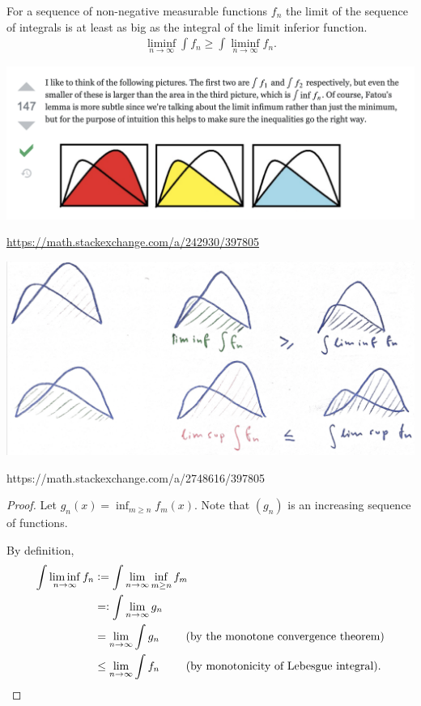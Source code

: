 \begin{theorem}
  For a sequence of non-negative measurable functions $f_n$ the limit of the sequence of integrals is at least
  as big as the integral of the limit inferior function.
  \begin{align*}
    \liminf_{n\to\infty} \int f_n \geq \int \liminf_{n\to\infty} f_n.
  \end{align*}
\end{theorem}

\begin{mdframed}
\includegraphics[width=400pt]{img/analysis--berkeley-202a--billingsley-section-1--lebesgue-integral-a3de.png}
\end{mdframed}
\url{https://math.stackexchange.com/a/242930/397805}

\begin{mdframed}
\includegraphics[width=400pt]{img/analysis--berkeley-202a--billingsley-section-1--lebesgue-integral-70e1.png}
\end{mdframed}


 https://math.stackexchange.com/a/2748616/397805

\begin{proof}
  Let $g_n(x) = \inf_{m\geq n}f_m(x)$. Note that $(g_n)$ is an increasing sequence of functions.

  By definition,
  \begin{align*}
    \int \liminf_{n\to\infty} f_n
    &:= \int \limn \inf_{m\geq n}f_m \\
    &=: \int \limn g_n \\
    &= \limn \int g_n ~~~~~~~\text{(by the monotone convergence theorem)}\\
    &\leq \limn \int f_n ~~~~~~~\text{(by monotonicity of Lebesgue integral)}.
  \end{align*}
\end{proof}


